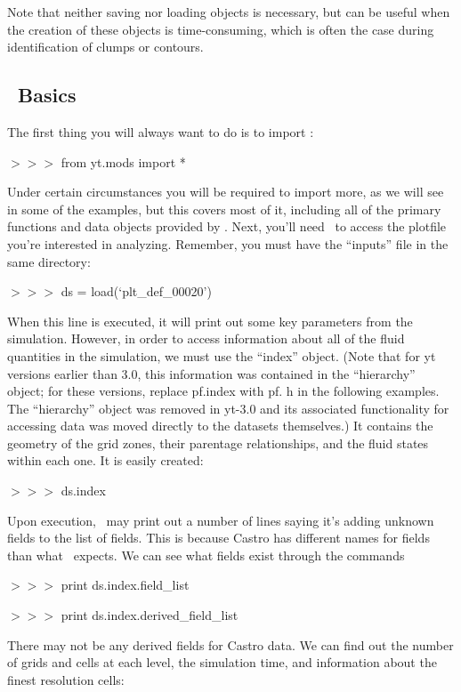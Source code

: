 Note that neither saving nor loading objects is necessary, but can be
useful when the creation of these objects is time-consuming, which is
often the case during identification of clumps or contours.

\subsection{\yt\ Basics}

The first thing you will always want to do is to import \yt:

{{\scriptsize$>>>$}} from yt.mods import *

Under certain circumstances you will be required to import more, as we
will see in some of the examples, but this covers most of it,
including all of the primary functions and data objects provided by
\yt. Next, you'll need \yt\ to access the plotfile you're interested in
analyzing. Remember, you must have the ``inputs'' file in the same
directory:

{\scriptsize$>>>$} ds = load(`plt\_def\_00020')

When this line is executed, it will print out some key parameters from
the simulation. However, in order to access information about all of
the fluid quantities in the simulation, we must use the ``index''
object. (Note that for yt versions earlier than 3.0, this information
was contained in the ``hierarchy'' object; for these versions, replace
pf.index with pf. h in the following examples. The ``hierarchy'' object
was removed in yt-3.0 and its associated functionality for accessing data
was moved directly to the datasets themselves.) It contains the geometry
of the grid zones, their parentage relationships, and the fluid states
within each one. It is easily created:

{\scriptsize$>>>$} ds.index

Upon execution, \yt\ may print out a number of lines saying it's adding
unknown fields to the list of fields. This is because Castro has
different names for fields than what \yt\ expects. We can see what
fields exist through the commands

{\scriptsize$>>>$} print ds.index.field\_list

{\scriptsize$>>>$} print ds.index.derived\_field\_list

There may not be any derived fields for Castro data. We can find out
the number of grids and cells at each level, the simulation time, and
information about the finest resolution cells:

